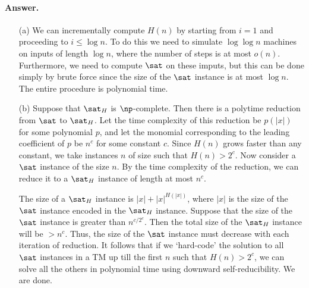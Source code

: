 \paragraph{Answer.} \begin{itemize}
	\item[(a)] We can incrementally compute $H(n)$ by starting from $i=1$ and proceeding to $i\leq\log n$. To do this we need to simulate $\log\log n$ machines on inputs of length $\log n$, where the number of steps is at most $o(n)$. Furthermore, we need to compute $\sat$ on these imputs, but this can be done simply by brute force since the size of the $\sat$ instance is at most $\log n$. The entire procedure is polynomial time.
	
	\item[(b)] Suppose that $\sat_H$ is $\np$-complete. Then there is a polytime reduction from $\sat$ to $\sat_H$. Let the time complexity of this reduction be $p(|x|)$ for some polynomial $p$, and let the monomial corresponding to the leading coefficient of $p$ be $n^c$ for some constant $c$. Since $H(n)$ grows faster than any constant, we take instances $n$ of size such that $H(n)>2^c$. Now consider a $\sat$ instance of the size $n$. By the time complexity of the reduction, we can reduce it to a $\sat_H$ instance of length at most $n^c$.
	
	The size of a $\sat_H$ instance is $|x|+|x|^{H(|x|)}$, where $|x|$ is the size of the $\sat$ instance encoded in the $\sat_H$ instance. Suppose that the size of the $\sat$ instance is greater than  $n^{c/2^c}$. Then the total size of the $\sat_H$ instance will be $>{n}^{c}$. Thus, the size of the $\sat$ instance must decrease with each iteration of reduction. It follows that if we `hard-code' the solution to all $\sat$ instances in a TM up till the first $n$ such that $H(n)>2^c$, we can solve all the others in polynomial time using downward self-reducibility. We are done. 
\end{itemize}